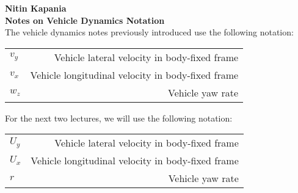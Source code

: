 \documentclass[11pt]{article}
\begin{document}
\textbf{Nitin Kapania} \\
\textbf{Notes on Vehicle Dynamics Notation} \\ 

The vehicle dynamics notes previously introduced use the following notation:

\begin{center}
\begin{tabular}{ l | r }
 $v_y$ & Vehicle lateral velocity in body-fixed frame \\ 
 $v_x$ & Vehicle longitudinal velocity in body-fixed frame \\ 
 $w_z$ & Vehicle yaw rate \\   
\end{tabular}
\end{center}

For the next two lectures, we will use the following notation:

\begin{center}
\begin{tabular}{ l | r }
 $U_y$ & Vehicle lateral velocity in body-fixed frame \\ 
 $U_x$ & Vehicle longitudinal velocity in body-fixed frame \\ 
 $r$ & Vehicle yaw rate \\   
\end{tabular}
\end{center}
\end{document}
